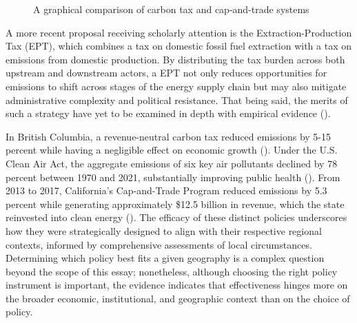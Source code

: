 \documentclass[12pt, a4paper, twoside]{article}
\begin{document}
\begin{figure}[ht]
  \caption{A graphical comparison of carbon tax and cap-and-trade systems}
  \label{fig:carbon-vs-cap}
\end{figure}

A more recent proposal receiving scholarly attention is the Extraction-Production Tax (EPT), which combines a tax on domestic fossil fuel extraction with a tax on emissions from domestic production. By distributing the tax burden across both upstream and downstream actors, a EPT not only reduces opportunities for emissions to shift across stages of the energy supply chain but may also mitigate administrative complexity and political resistance. That being said, the merits of such a strategy have yet to be examined in depth with empirical evidence (\cite{weisbach2023climate}).  

In British Columbia, a revenue-neutral carbon tax reduced emissions by 5-15 percent while having a negligible effect on economic growth (\cite[p.\ 678]{murray2015british}). Under the U.S. Clean Air Act, the aggregate emissions of six key air pollutants declined by 78 percent between 1970 and 2021, substantially improving public health (\cite{aapca2024stats}). From 2013 to 2017, California’s Cap-and-Trade Program reduced emissions by 5.3 percent while generating approximately \$12.5 billion in revenue, which the state reinvested into clean energy (\cite{c2es2025california}). The efficacy of these distinct policies underscores how they were strategically designed to align with their respective regional contexts, informed by comprehensive assessments of local circumstances. Determining which policy best fits a given geography is a complex question beyond the scope of this essay; nonetheless, although choosing the right policy instrument is important, the evidence indicates that effectiveness hinges more on the broader economic, institutional, and geographic context than on the choice of policy. 
\end{document}
